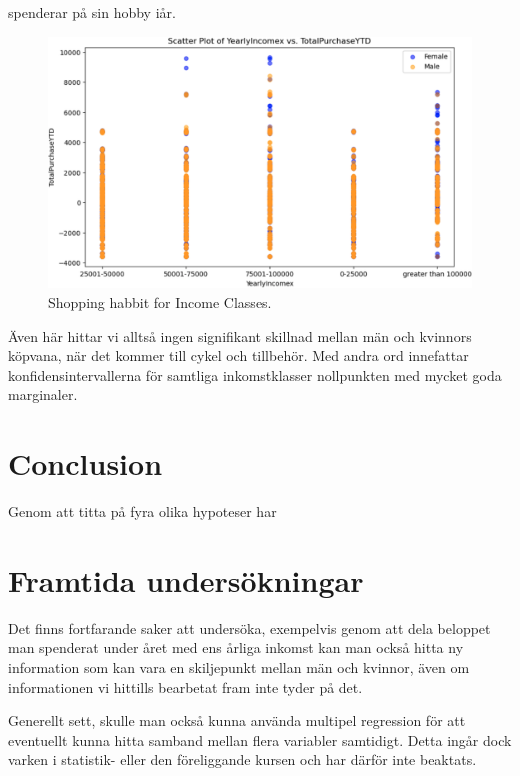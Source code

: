 \documentclass[]{article}
\begin{document}
spenderar på sin hobby iår.
\begin{figure}[h]
    \centering
    \includegraphics[width=\textwidth]{img_shopping_habbit_for_income_classes.png}
    \caption{Shopping habbit for Income Classes.}
\end{figure}

Även här hittar vi alltså ingen signifikant skillnad mellan män och kvinnors köpvana, när det kommer till cykel och tillbehör. Med andra ord innefattar konfidensintervallerna för samtliga inkomstklasser nollpunkten med mycket goda marginaler.

\section{Conclusion}

Genom att titta på fyra olika hypoteser har 






\section{Framtida undersökningar}

Det finns fortfarande saker att undersöka, exempelvis genom att dela beloppet man spenderat under året med ens årliga inkomst kan man också hitta ny information som kan vara en skiljepunkt mellan män och kvinnor, även om informationen vi hittills bearbetat fram inte tyder på det.

Generellt sett, skulle man också kunna använda multipel regression för att eventuellt kunna hitta samband mellan flera variabler samtidigt. Detta ingår dock varken i statistik- eller den föreliggande kursen och har därför inte beaktats.
\end{document}
